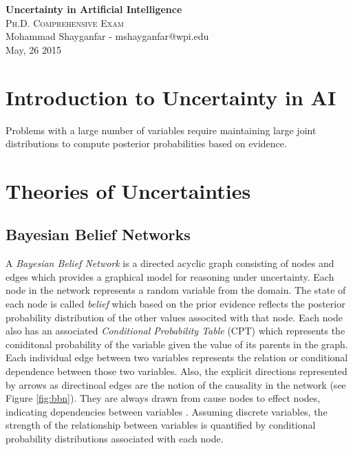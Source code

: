 \documentclass[11pt]{article}
\begin{document}

\begin{center}
{\LARGE{\textbf{Uncertainty in Artificial Intelligence}}} \\
\Large\textsc{Ph.D. Comprehensive Exam} \\[1em]
\large\textnormal{Mohammad Shayganfar - mshayganfar@wpi.edu} \\
\large\textnormal{May, 26 2015}
\end{center}

\section{Introduction to Uncertainty in AI}

Problems with a large number of variables require maintaining large joint
distributions to compute posterior probabilities based on evidence.

\section{Theories of Uncertainties}

\subsection{Bayesian Belief Networks}

A \textit{Bayesian Belief Network} is a  directed acyclic graph consisting of
nodes and edges which provides a graphical model for reasoning under
uncertainty. Each node in the network represents a random variable from the
domain. The state of each node is called \textit{belief} which based on the
prior evidence reflects the posterior probability distribution of the other
values associted with that node. Each node also has an associated
\textit{Conditional Probability Table} (CPT) which represents the coniditonal
probability of the variable given the value of its parents in the graph. Each
individual edge between two variables represents the relation or conditional
dependence between those two variables. Also, the explicit directions
represented by arrows as directinoal edges are the notion of the causality in
the network (see Figure \ref{fig:bbn}). They are always drawn from cause nodes
to effect nodes, indicating dependencies between variables
\cite{das:decision-making-agents}. Assuming discrete variables, the strength of
the relationship between variables is quantified by conditional probability
distributions associated with each node.
\end{document}
